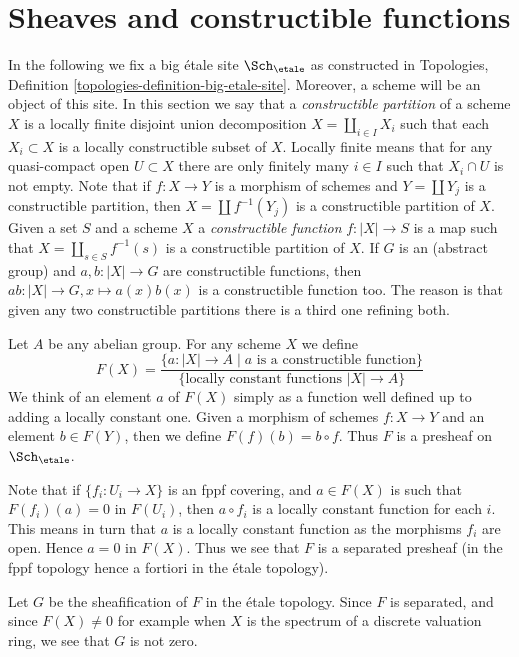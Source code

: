 \section{Sheaves and constructible functions}
\label{section-constructible-functions}

\noindent
In the following we fix a big \'etale site $\Sch_\etale$ as constructed in
Topologies, Definition \ref{topologies-definition-big-etale-site}.
Moreover, a scheme will be an object of this site.
In this section we say that a {\it constructible partition}
of a scheme $X$ is a locally finite disjoint union decomposition
$X = \coprod_{i \in I} X_i$ such that each $X_i \subset X$ is a
locally constructible subset of $X$. Locally finite means that
for any quasi-compact open $U \subset X$ there are only finitely
many $i \in I$ such that $X_i \cap U$ is not empty.
Note that if $f : X \to Y$ is a morphism of schemes and
$Y = \coprod Y_j$ is a constructible partition, then
$X = \coprod f^{-1}(Y_j)$ is a constructible partition of $X$.
Given a set $S$ and a scheme $X$ a {\it constructible function}
$f : |X| \to S$ is a map such that $X = \coprod_{s \in S} f^{-1}(s)$
is a constructible partition of $X$.
If $G$ is an (abstract group) and $a, b : |X| \to G$ are constructible
functions, then $ab : |X| \to G, x \mapsto a(x)b(x)$ is a constructible
function too. The reason is that given any two constructible partitions
there is a third one refining both.

\medskip\noindent
Let $A$ be any abelian group. For any scheme $X$ we define
$$
F(X) =
\frac{\{a : |X| \to A \mid a \text{ is a constructible function}\}}{\{\text{locally constant functions }|X| \to A\}}
$$
We think of an element $a$ of $F(X)$ simply as a function well defined
up to adding a locally constant one. Given a morphism of schemes
$f : X \to Y$ and an element $b \in F(Y)$, then we define
$F(f)(b) = b \circ f$. Thus $F$ is a presheaf on $\Sch_\etale$.

\medskip\noindent
Note that if $\{f_i : U_i \to X\}$ is an fppf covering, and $a \in F(X)$
is such that $F(f_i)(a) = 0$ in $F(U_i)$, then $a \circ f_i$ is a locally
constant function for each $i$. This means in turn that $a$ is a locally
constant function as the morphisms $f_i$ are open. Hence $a = 0$ in $F(X)$.
Thus we see that $F$ is a separated presheaf (in the fppf topology
hence a fortiori in the \'etale topology).

\medskip\noindent
Let $G$ be the sheafification of $F$ in the \'etale topology.
Since $F$ is separated, and since $F(X) \not = 0$ for example when
$X$ is the spectrum of a discrete valuation ring, we see that $G$
is not zero.

